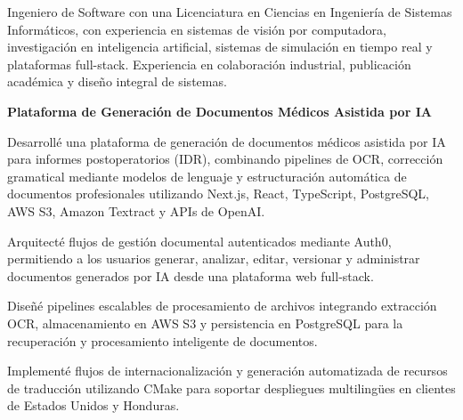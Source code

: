 \documentclass{../../../Styles/MS-Style}
\begin{document}
\begin{center}

\end{center}

\begin{Form}
	\normalsize{
		Ingeniero de Software con una Licenciatura en Ciencias en Ingeniería de Sistemas Informáticos,
		con experiencia en sistemas de visión por computadora, investigación en inteligencia artificial,
		sistemas de simulación en tiempo real y plataformas full-stack.
		Experiencia en colaboración industrial, publicación académica y diseño integral de sistemas.
	}




	\textbf{Plataforma de Generación de Documentos Médicos Asistida por IA}

	\begin{listBlock}
		\generalItem
		Desarrollé una plataforma de generación de documentos médicos asistida por IA para informes postoperatorios (IDR), combinando pipelines de OCR, corrección gramatical mediante modelos de lenguaje y estructuración automática de documentos profesionales utilizando Next.js, React, TypeScript, PostgreSQL, AWS S3, Amazon Textract y APIs de OpenAI.

		\generalItem
		Arquitecté flujos de gestión documental autenticados mediante Auth0, permitiendo a los usuarios generar, analizar, editar, versionar y administrar documentos generados por IA desde una plataforma web full-stack.

		\generalItem
		Diseñé pipelines escalables de procesamiento de archivos integrando extracción OCR, almacenamiento en AWS S3 y persistencia en PostgreSQL para la recuperación y procesamiento inteligente de documentos.

		\generalItem
		Implementé flujos de internacionalización y generación automatizada de recursos de traducción utilizando CMake para soportar despliegues multilingües en clientes de Estados Unidos y Honduras.
	\end{listBlock}


\end{Form}
\end{document}
